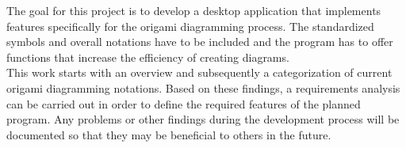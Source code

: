 The goal for this project is to develop a desktop application that implements features specifically for the origami diagramming process. The standardized symbols and overall notations have to be included and the program has to offer functions that increase the efficiency of creating diagrams.\\
This work starts with an overview and subsequently a categorization of current origami diagramming notations. Based on these findings, a requirements analysis can be carried out in order to define the required features of the planned program. Any problems or other findings during the development process will be documented so that they may be beneficial to others in the future.

